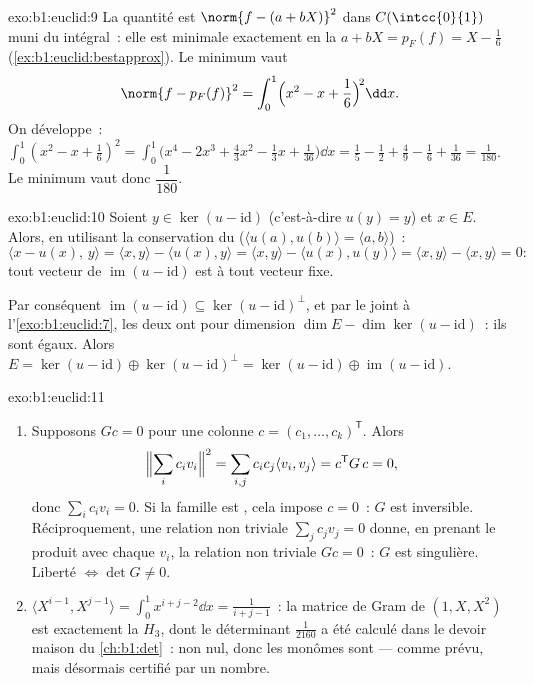 \begin{solution}{exo:b1:euclid:9}
La quantité est $\norm{f - (a + bX)}^2$ dans $C(\intcc{0}{1})$ muni du
 intégral~: elle est minimale exactement en la
 $a + bX = p_F(f) = X - \frac16$
(\cref{ex:b1:euclid:bestapprox}). Le minimum vaut
\[
\norm{f - p_F(f)}^2 = \int_0^1 \Bigl(x^2 - x + \frac16\Bigr)^{\!2}
\dd x .
\]
On développe~: $\int_0^1 (x^2 - x + \frac16)^2 = \int_0^1 \bigl(x^4 -
2x^3 + \frac{4}{3}x^2 - \frac13 x + \frac{1}{36}\bigr)\dd x = \frac15 -
\frac12 + \frac49 - \frac16 + \frac{1}{36} = \frac{1}{180}$.
Le minimum vaut donc $\dfrac{1}{180}$.
\end{solution}

\begin{solution}{exo:b1:euclid:10}
Soient $y \in \ker(u - \mathrm{id})$ (c'est-à-dire $u(y) = y$) et $x
\in E$. Alors, en utilisant la conservation du 
($\langle u(a), u(b)\rangle = \langle a, b\rangle$)~:
\[
\langle x - u(x),\, y\rangle
= \langle x, y\rangle - \langle u(x), y\rangle
= \langle x, y\rangle - \langle u(x), u(y)\rangle
= \langle x, y\rangle - \langle x, y\rangle = 0 :
\]
tout vecteur de $\operatorname{im}(u - \mathrm{id})$ est 
à tout vecteur fixe.

Par conséquent $\operatorname{im}(u - \mathrm{id}) \subseteq \ker(u -
\mathrm{id})^{\perp}$, et par le  joint à
l'\cref{exo:b1:euclid:7}, les deux ont pour dimension $\dim E -
\dim\ker(u - \mathrm{id})$~: ils sont égaux. Alors $E = \ker(u -
\mathrm{id}) \oplus \ker(u - \mathrm{id})^\perp = \ker(u -
\mathrm{id}) \oplus \operatorname{im}(u - \mathrm{id})$.
\end{solution}

\begin{solution}{exo:b1:euclid:11}
\begin{enumerate}
  \item Supposons $Gc = 0$ pour une colonne $c = (c_1, \dots,
        c_k)^{\mathsf T}$. Alors
        \[
        \Bigl\lVert\sum_i c_i v_i\Bigr\rVert^2
        = \sum_{i,j} c_i c_j \langle v_i, v_j\rangle
        = c^{\mathsf T} G\, c = 0,
        \]
        donc $\sum_i c_i v_i = 0$. Si la famille est , cela
        impose $c = 0$~: $G$ est inversible. Réciproquement, une
        relation non triviale $\sum_j c_j v_j = 0$ donne, en
        prenant le produit avec chaque $v_i$, la relation non
        triviale $Gc = 0$~: $G$ est singulière. Liberté $\iff \det
        G \neq 0$.
  \item $\langle X^{i-1}, X^{j-1}\rangle = \int_0^1 x^{i+j-2}\dd
        x = \frac{1}{i+j-1}$~: la matrice de Gram de $(1, X, X^2)$
        est exactement la  $H_3$, dont le
        déterminant $\frac1{2160}$ a été calculé dans le devoir
        maison du \cref{ch:b1:det}~: non nul, donc les monômes
        sont  --- comme prévu, mais désormais certifié par
        un nombre.
\end{enumerate}
\end{solution}

